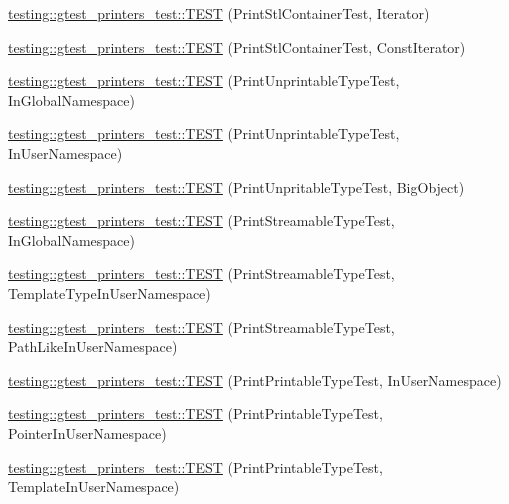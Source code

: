 \begin{DoxyCompactItemize}
\item 
\mbox{\hyperlink{namespacetesting_1_1gtest__printers__test_a01ec32faf0032f9fbcf4895d8d6e4aa9}{testing\+::gtest\+\_\+printers\+\_\+test\+::\+T\+E\+ST}} (Print\+Stl\+Container\+Test, Iterator)
\item 
\mbox{\hyperlink{namespacetesting_1_1gtest__printers__test_a3b54f9a039804190b7ff2e818169c0f2}{testing\+::gtest\+\_\+printers\+\_\+test\+::\+T\+E\+ST}} (Print\+Stl\+Container\+Test, Const\+Iterator)
\item 
\mbox{\hyperlink{namespacetesting_1_1gtest__printers__test_a805264fd24de8e65cba977a798abc54c}{testing\+::gtest\+\_\+printers\+\_\+test\+::\+T\+E\+ST}} (Print\+Unprintable\+Type\+Test, In\+Global\+Namespace)
\item 
\mbox{\hyperlink{namespacetesting_1_1gtest__printers__test_a0aa1499e978bdde6c71e49ecc9db695b}{testing\+::gtest\+\_\+printers\+\_\+test\+::\+T\+E\+ST}} (Print\+Unprintable\+Type\+Test, In\+User\+Namespace)
\item 
\mbox{\hyperlink{namespacetesting_1_1gtest__printers__test_a6b6fba2a191094244f8aa78a4933a2c5}{testing\+::gtest\+\_\+printers\+\_\+test\+::\+T\+E\+ST}} (Print\+Unpritable\+Type\+Test, Big\+Object)
\item 
\mbox{\hyperlink{namespacetesting_1_1gtest__printers__test_a80fe9d71227a97b12fd5336a823c3d17}{testing\+::gtest\+\_\+printers\+\_\+test\+::\+T\+E\+ST}} (Print\+Streamable\+Type\+Test, In\+Global\+Namespace)
\item 
\mbox{\hyperlink{namespacetesting_1_1gtest__printers__test_a8ccd96504d676671a0429073d5012ff1}{testing\+::gtest\+\_\+printers\+\_\+test\+::\+T\+E\+ST}} (Print\+Streamable\+Type\+Test, Template\+Type\+In\+User\+Namespace)
\item 
\mbox{\hyperlink{namespacetesting_1_1gtest__printers__test_a243b88c8a03fb501c573c25da302ca98}{testing\+::gtest\+\_\+printers\+\_\+test\+::\+T\+E\+ST}} (Print\+Streamable\+Type\+Test, Path\+Like\+In\+User\+Namespace)
\item 
\mbox{\hyperlink{namespacetesting_1_1gtest__printers__test_a52f5df394111bcc55aecc59ce426088d}{testing\+::gtest\+\_\+printers\+\_\+test\+::\+T\+E\+ST}} (Print\+Printable\+Type\+Test, In\+User\+Namespace)
\item 
\mbox{\hyperlink{namespacetesting_1_1gtest__printers__test_a3da6191eff6b016540024c2bfccdd90b}{testing\+::gtest\+\_\+printers\+\_\+test\+::\+T\+E\+ST}} (Print\+Printable\+Type\+Test, Pointer\+In\+User\+Namespace)
\item 
\mbox{\hyperlink{namespacetesting_1_1gtest__printers__test_aa697a3cf25b7f51f26ab49ed8ac3dd31}{testing\+::gtest\+\_\+printers\+\_\+test\+::\+T\+E\+ST}} (Print\+Printable\+Type\+Test, Template\+In\+User\+Namespace)

\end{DoxyCompactItemize}
